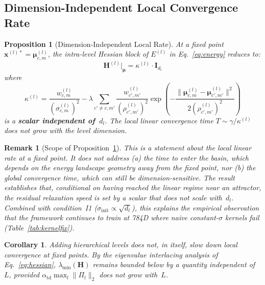 \documentclass[11pt,a4paper]{article}
\newtheorem{proposition}[theorem]{Proposition}
\newtheorem{corollary}[theorem]{Corollary}
\newtheorem{remark}[theorem]{Remark}
\begin{document}
\subsection{Dimension-Independent Local Convergence Rate}
\label{sec:theory:dimindep}

\begin{proposition}[Dimension-Independent Local Rate]
\label{prop:dimindep}
At a fixed point $\mathbf{x}^{(l)*} = \boldsymbol{\mu}^{(l)}_{c,m}$, the intra-level
Hessian block of $E^{(l)}$ in Eq.~\ref{eq:energy} reduces to:
\begin{equation}
  \mathbf{H}^{(l)}\big|_{\boldsymbol{\mu}} = \kappa^{(l)} \cdot \mathbf{I}_{d_l}
\end{equation}
where
\[
\kappa^{(l)} = \frac{w^{(l)}_{c,m}}{(\sigma^{(l)}_{c,m})^2}
  - \lambda \sum_{c' \ne c, m'} \frac{w^{(l)}_{c',m'}}{(\rho^{(l)}_{c',m'})^2}
    \exp\!\left(-\frac{\|\boldsymbol{\mu}^{(l)}_{c,m} - \boldsymbol{\mu}^{(l)}_{c',m'}\|^2}{2(\rho^{(l)}_{c',m'})^2}\right)
\]
is a \textbf{scalar independent of~$d_l$}. The local linear convergence time
$T \sim \gamma/\kappa^{(l)}$ does not grow with the level dimension.
\end{proposition}

\begin{remark}[Scope of Proposition~\ref{prop:dimindep}]
This is a statement about the \emph{local} linear rate at a fixed point. It does not
address (a) the time to \emph{enter} the basin, which depends on the energy landscape
geometry away from the fixed point, nor (b) the global convergence time, which can still
be dimension-sensitive. The result establishes that, \emph{conditional on having reached
the linear regime near an attractor}, the residual relaxation speed is set by a scalar
that does not scale with~$d_l$. Combined with condition~I1
($\sigma_{\mathrm{init}} \propto \sqrt{d_l}$), this explains the empirical observation
that the framework continues to train at 784D where naive constant-$\sigma$ kernels fail
(Table~\ref{tab:kernelfix}).
\end{remark}

\begin{corollary}
\label{cor:depth}
Adding hierarchical levels does not, in itself, slow down local convergence at fixed
points. By the eigenvalue interlacing analysis of Eq.~\ref{eq:hessian},
$\lambda_{\min}(\mathbf{H})$ remains bounded below by a quantity independent of~$L$,
provided $\alpha_{\mathrm{td}}\max_l\|\Pi_l\|_2$ does not grow with~$L$.
\end{corollary}
\end{document}
